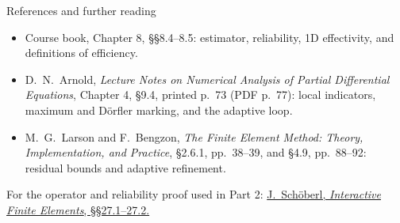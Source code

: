 \documentclass[11pt,aspectratio=169]{beamer}
\begin{document}
\begin{frame}{References and further reading}
\begin{itemize}
 \item Course book, Chapter 8, \S\S8.4--8.5: estimator, reliability,
 1D effectivity, and definitions of efficiency.
 \item D.~N.~Arnold, \emph{Lecture Notes on Numerical Analysis of Partial
 Differential Equations}, Chapter 4, \S9.4, printed p.~73 (PDF p.~77):
 local indicators, maximum and D\"orfler marking, and the adaptive loop.
 \item M.~G.~Larson and F.~Bengzon, \emph{The Finite Element Method:
 Theory, Implementation, and Practice}, \S2.6.1, pp.~38--39, and
 \S4.9, pp.~88--92: residual bounds and adaptive refinement.
\end{itemize}
For the operator and reliability proof used in Part 2:
\href{https://jschoeberl.github.io/iFEM/aposteriori/residualEE.html}{J.~Sch\"oberl, \emph{Interactive Finite Elements}, \S\S27.1--27.2.}
\end{frame}
\end{document}
